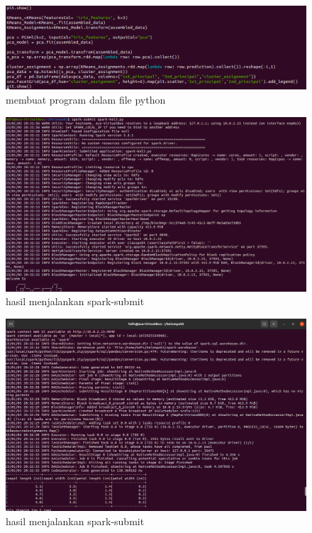\begin{enumerate}
\begin{figure}[!ht]
\includegraphics[width=\textwidth]{TugasKelompok/Kelompok5/file-nano1}
\caption{membuat program dalam file python}
\label{gam:file}
\end{figure}

\begin{figure}[!ht]
\includegraphics[width=\textwidth]{TugasKelompok/Kelompok5/spark-submit1}
\caption{hasil menjalankan spark-submit}
\label{gam:spark-submit}
\end{figure}

\begin{figure}[!ht]
\includegraphics[width=\textwidth]{TugasKelompok/Kelompok5/spark-submit2}
\caption{hasil menjalankan spark-submit}
\label{gam:spark-submit}
\end{figure}


\end{enumerate}
